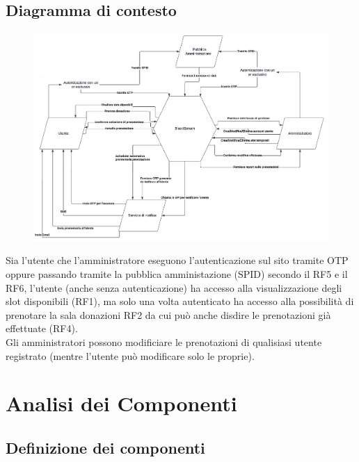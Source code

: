 \documentclass{article}
\begin{document}
\subsection{Diagramma di contesto}
\begin{description}


\begin{figure}[htp]
		\centering
		\includegraphics[width=\textwidth]{context-diag.png}
	\end{figure}

\item[] Sia l’utente che l’amministratore eseguono l’autenticazione sul sito tramite OTP oppure passando tramite la pubblica amministazione (SPID) secondo il RF5 e il RF6, l’utente (anche senza autenticazione) ha accesso alla visualizzazione degli slot disponibili (RF1), ma solo una volta autenticato ha accesso alla possibilità di prenotare la sala donazioni RF2 da cui può anche disdire le prenotazioni già effettuate (RF4). \\ Gli amministratori possono modificiare le prenotazioni di qualisiasi utente registrato (mentre l’utente può modificare solo le proprie).
\end{description}


\clearpage

\section{Analisi dei Componenti}
\subsection{Definizione dei componenti}
\end{document}
